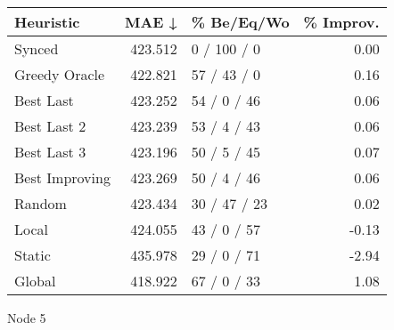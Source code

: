 \begin{tabular}{lrlr}
\toprule
\textbf{Heuristic} & \textbf{MAE ↓} & \textbf{\% Be/Eq/Wo} & \textbf{\% Improv.} \\
\midrule
            Synced &        423.512 &          0 / 100 / 0 &                0.00 \\
     Greedy Oracle &        422.821 &          57 / 43 / 0 &                0.16 \\
         Best Last &        423.252 &          54 / 0 / 46 &                0.06 \\
       Best Last 2 &        423.239 &          53 / 4 / 43 &                0.06 \\
       Best Last 3 &        423.196 &          50 / 5 / 45 &                0.07 \\
    Best Improving &        423.269 &          50 / 4 / 46 &                0.06 \\
            Random &        423.434 &         30 / 47 / 23 &                0.02 \\
             Local &        424.055 &          43 / 0 / 57 &               -0.13 \\
            Static &        435.978 &          29 / 0 / 71 &               -2.94 \\
            Global &        418.922 &          67 / 0 / 33 &                1.08 \\
\bottomrule
\end{tabular}
\caption{Node 5}
\label{tab:non_lr01_le1_bs4_5}
